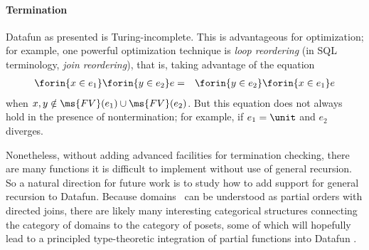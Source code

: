 \paragraph{Termination}

Datafun as presented is Turing-incomplete. This is advantageous for
optimization; for example, one powerful optimization technique is \emph{loop
  reordering} (in SQL terminology, \emph{join reordering}), that is, taking
advantage of the equation
\begin{eqnarray*}
  \forin{x \in e_1} \forin{y \in e_2} e
  &=& \forin{y \in e_2} \forin{x \in e_1} e
\end{eqnarray*}
when $x,y \notin \ms{FV}(e_1) \cup \ms{FV}(e_2)$. But this equation does not
always hold in the presence of nontermination; for example, if $e_1 = \unit$ and
$e_2$ diverges.

Nonetheless, without adding advanced facilities for termination
checking, there are many functions it is difficult to implement
without use of general recursion. So a natural direction for future
work is to study how to add support for general recursion to Datafun.
Because domains~\cite{domain-theory} can be understood as partial
orders with directed joins, there are likely many interesting
categorical structures connecting the category of domains to the
category of posets, some of which will hopefully lead to a principled
type-theoretic integration of partial functions into Datafun .

%

